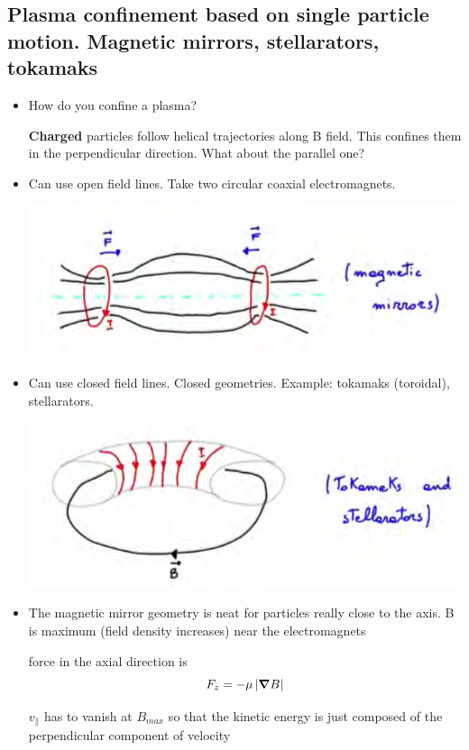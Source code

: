 	\subsection{Plasma confinement based on single particle motion. Magnetic mirrors, stellarators, tokamaks}
	\begin{itemize}
	\item How do you confine a plasma?
	
	\textbf{Charged} particles follow helical trajectories along B field. This confines them in the perpendicular direction. What about the parallel one?
	\item Can use open field lines. Take two circular coaxial electromagnets.
	
	\includegraphics[width=\linewidth]{magneticmirror}
	
	\item Can use closed field lines. Closed geometries. Example: tokamaks (toroidal), stellarators.
	
	\includegraphics[width=\linewidth]{tokamakconfinement}
	
	\item The magnetic mirror geometry is neat for particles really close to the axis. B is maximum (field density increases) near the electromagnets
	
	force in the axial direction is \[F_z =-\mu\left| \mbox{\boldmath$ \nabla $} B \right|\]
	
	$v_{\parallel}$ has to vanish at $B_{max}$ so that the kinetic energy is just composed of the perpendicular component of velocity
	

\end{itemize}
